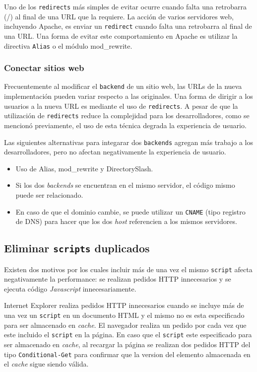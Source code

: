\documentclass[a4paper,12pt]{report}
\begin{document}
Uno de los \texttt{redirects} más simples de evitar ocurre cuando falta una retrobarra (/) al final de una URL que la requiere. La acción de varios servidores web,
incluyendo Apache, es enviar un \texttt{redirect} cuando falta una retrobarra al final de una URL. Una forma de evitar este comportamiento en Apache es utilizar la directiva
\texttt{Alias} o el módulo mod\_rewrite.

\subsubsection{Conectar sitios web}

Frecuentemente al modificar el \texttt{backend} de un sitio web, las URLs de la nueva implementación pueden variar respecto a las originales. Una forma de dirigir a los
usuarios a la nueva URL es mediante el uso de \texttt{redirects}. A pesar de que la utilización de \texttt{redirects} reduce la complejidad para los desarrolladores, como
se mencionó previamente, el uso de esta técnica degrada la experiencia de usuario.

Las siguientes alternativas para integarar dos \texttt{backends} agregan más trabajo a los desarrolladores, pero no afectan negativamente la experiencia de usuario.
\begin{itemize}
\item
Uso de Alias, mod\_rewrite y DirectorySlash.
\item
Si los dos \emph{backends} se encuentran en el mismo servidor, el código mismo puede ser relacionado.
\item
En caso de que el dominio cambie, se puede utilizar un \texttt{CNAME} (tipo registro de DNS)  para hacer que los dos \emph{host} referencien a los
mismos servidores.
\end{itemize}

\subsection{Eliminar \texttt{scripts} duplicados}

Existen dos motivos por los cuales incluir más de una vez el mismo \texttt{script} afecta negativamente la performance: se realizan pedidos HTTP innecesarios
y se ejecuta código \emph{Javascript} innecesariamente.

Internet Explorer realiza pedidos HTTP innecesarios cuando se incluye más de una vez un \texttt{script} en un documento HTML
y el mismo no es esta especificado para ser almacenado en \emph{cache}. El navegador realiza un pedido por cada vez que este incluido el \texttt{script} en la página.
En caso que el \texttt{script} este especificado para ser almacenado en \emph{cache}, al recargar la página se realizan dos pedidos HTTP del tipo \texttt{Conditional-Get} para
confirmar que la version del elemento almacenada en el \emph{cache} sigue siendo válida.
\end{document}
